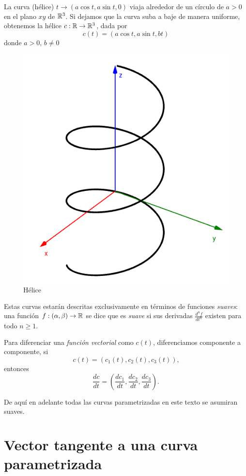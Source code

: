 \begin{myExample}
    La curva (hélice) $t \rightarrow (a\cos{t},a\sin{t},0)$ viaja alrededor de un círculo de 
    $a > 0$ en el plano $xy$ de $\mathbb{R}^{3}$. Si dejamos que la curva suba a baje de manera
    uniforme, obtenemos la hélice $c:\mathbb{R} \rightarrow \mathbb{R}^{3}$, dada por
    $$ c(t) = (a\cos{t}, a\sin{t}, bt) $$
    donde $a>0$, $b \ne 0$
\end{myExample}

\begin{figure}[!ht]
  \begin{center}
      \includegraphics[width=0.6\linewidth]{gfx/helice}
      \caption{Hélice}
      \label{fig:boat1}
  \end{center}
\end{figure}

Estas curvas estar\'an descritas exclusivamente en t\'erminos de funciones \emph{suaves}: una funci\'on
$f:(\alpha,\beta) \rightarrow \mathbb{R}$ se dice que es \emph{suave} si sus derivadas $\frac{d^{n}f}{dt^{n}}$
existen para todo $n \ge 1$.

Para diferenciar una \emph{funci\'on vectorial} como $c(t)$, diferenciamos componente a componente, si
$$ c(t) = (c_{1}(t),c_{2}(t),c_{3}(t))\text{,}$$
entonces
$$ \frac{dc}{dt} = \left( \frac{dc_{1}}{dt},\frac{dc_{2}}{dt},\frac{dc_{3}}{dt}\right)\text{.}$$

De aqu\'i en adelante todas las curvas parametrizadas en este texto se asumiran suaves.

\section{Vector tangente a una curva parametrizada}

